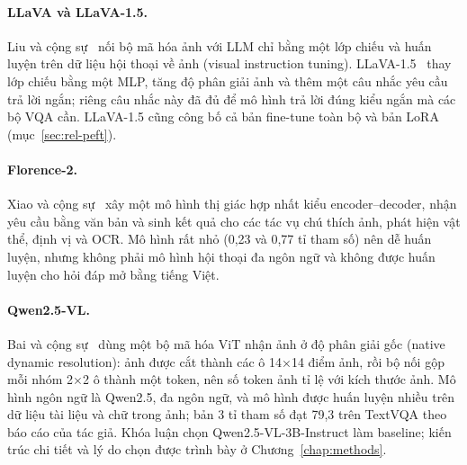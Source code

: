 \paragraph{LLaVA và LLaVA-1.5.} Liu và cộng sự~\cite{liu2023llava} nối bộ mã hóa ảnh với LLM
chỉ bằng một lớp chiếu và huấn luyện trên dữ liệu hội thoại về ảnh (visual
instruction tuning). LLaVA-1.5~\cite{liu2024llava15} thay lớp chiếu bằng một MLP,
tăng độ phân giải ảnh và thêm một câu nhắc yêu cầu trả lời ngắn; riêng câu nhắc
này đã đủ để mô hình trả lời đúng kiểu ngắn mà các bộ VQA cần. LLaVA-1.5 cũng
công bố cả bản fine-tune toàn bộ và bản LoRA (mục~\ref{sec:rel-peft}).

\paragraph{Florence-2.} Xiao và cộng sự~\cite{xiao2024florence2} xây một mô hình thị giác hợp
nhất kiểu encoder--decoder, nhận yêu cầu bằng văn bản và sinh kết quả cho các tác
vụ chú thích ảnh, phát hiện vật thể, định vị và OCR. Mô hình rất nhỏ (0,23 và 0,77
tỉ tham số) nên dễ huấn luyện, nhưng không phải mô hình hội thoại đa ngôn ngữ và
không được huấn luyện cho hỏi đáp mở bằng tiếng Việt.

\paragraph{Qwen2.5-VL.} Bai và cộng sự~\cite{bai2025qwen25vl} dùng một bộ mã hóa ViT nhận ảnh ở
độ phân giải gốc (native dynamic resolution): ảnh được cắt thành các ô 14×14 điểm
ảnh, rồi bộ nối gộp mỗi nhóm 2×2 ô thành một token, nên số token ảnh tỉ lệ với
kích thước ảnh. Mô hình ngôn ngữ là Qwen2.5, đa ngôn ngữ, và mô hình được huấn
luyện nhiều trên dữ liệu tài liệu và chữ trong ảnh; bản 3 tỉ tham số đạt 79,3
trên TextVQA theo báo cáo của tác giả. Khóa luận chọn Qwen2.5-VL-3B-Instruct làm
baseline; kiến trúc chi tiết và lý do chọn được trình bày ở
Chương~\ref{chap:methods}.

